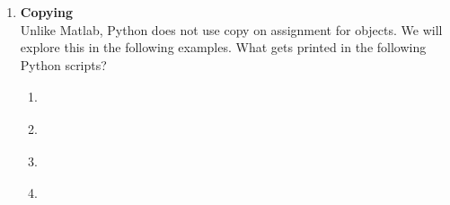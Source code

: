 \documentclass{article}
\newcounter{points}
\newcommand\printpoints{Total number of points: \thepoints}
\begin{document}
\begin{enumerate}
\begin{enumerate}
\setcounter{enumii}{2}
\item
\lstset{numbers=left}
\begin{tabular}{c}

\end{tabular}
\end{enumerate}


\item \textbf{Copying} \\
Unlike Matlab, Python does not use copy on assignment for objects.  We will explore this in the following examples.  What gets printed in the following Python scripts?

\begin{enumerate}
\item
\begin{tabular}{c}

\end{tabular}
\end{enumerate}

\vspace{0.05in}

\begin{enumerate}
\setcounter{enumii}{1}
\item
\begin{tabular}{c}

\end{tabular}
\end{enumerate}

\vspace{0.05in}

\begin{enumerate}
\setcounter{enumii}{2}
\item
\begin{tabular}{c}

\end{tabular}
\end{enumerate}

\vspace{0.05in}

\begin{enumerate}
\setcounter{enumii}{3}
\item
\begin{tabular}{c}

\end{tabular}
\end{enumerate}




\end{enumerate}
\end{document}
